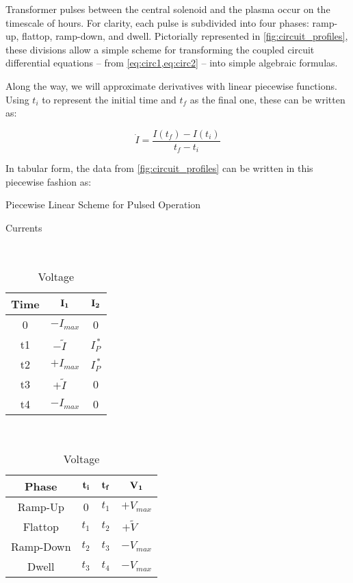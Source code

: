 Transformer pulses between the central solenoid and the plasma occur on the timescale of hours.  For clarity, each pulse is subdivided into four phases: ramp-up, flattop, ramp-down, and dwell. Pictorially represented in \cref{fig:circuit_profiles}, these divisions allow a simple scheme for transforming the coupled circuit differential equations -- from \cref{eq:circ1,eq:circ2} -- into simple algebraic formulas. 

Along the way, we will approximate derivatives with linear piecewise functions. Using $t_i$ to represent the initial time and $t_f$ as the final one, these can be written as:

\begin{equation}
	\dot I = \frac{ I(t_f) - I(t_i) }{t_f - t_i}
\end{equation}

In tabular form, the data from \cref{fig:circuit_profiles} can be written in this piecewise fashion as:

\begin{table}[h!]
\centering	
\caption{Piecewise Linear Scheme for Pulsed Operation}
\hfill
\begin{subtable}[t]{0.4\textwidth}
\centering	
\caption{Currents} ~\\
\begin{tabular}{ c|c|c } 

\textbf{Time} & {$\bold{I_1}$} & {$\bold{I_2}$} \\
\hline
0 & $-I_{max}$ & 0 \\ 
t1 & $-\tilde I \ \ \ \,\, $ & $I_P^{\,*} $ \\ 
t2 & $+I_{max}$ & $I_P^{\,*}$ \\ 
t3 & $+\tilde I \ \ \ \,\, $ & 0 \\ 
t4 & $-I_{max}$ & 0 \\ 
\end{tabular}
\end{subtable}
\hfill
\begin{subtable}[t]{0.5\textwidth}
\centering	
\caption{Voltage} ~\\
\begin{tabular}{ c|c|c|c } 
\textbf{Phase} & $\bold{t_i}$ & $\bold{t_f}$ & $\bold{V_1}$ \\
\hline
Ramp-Up & 0 & $t_1$ & $+V_{max}$ \\ 
Flattop & $t_1$ & $t_2$ & $+ \tilde V$ \ \,\,\, \\ 
Ramp-Down & $t_2$ & $t_3$ & ${-V}_{max}$ \\ 
Dwell & $t_3$ & $t_4$ & ${-V}_{max}$ \\ 
\end{tabular}
\end{subtable}
\hfill
\hfill
\end{table}

